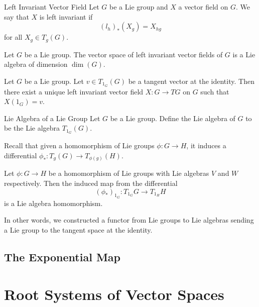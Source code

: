 \documentclass[a4paper]{article}
\begin{document}
\begin{defn}{Left Invariant Vector Field}{} Let $G$ be a Lie group and $X$ a vector field on $G$. We say that $X$ is left invariant if $$(l_h)_\ast(X_g)=X_{hg}$$ for all $X_g\in T_g(G)$. 
\end{defn}

\begin{prp}{}{} Let $G$ be a Lie group. The vector space of left invariant vector fields of $G$ is a Lie algebra of dimension $\dim(G)$. 
\end{prp}

\begin{prp}{}{} Let $G$ be a Lie group. Let $v\in T_{1_G}(G)$ be a tangent vector at the identity. Then there exist a unique left invariant vector field $X:G\to TG$ on $G$ such that $X({1_G})=v$. 
\end{prp}

\begin{defn}{Lie Algebra of a Lie Group}{} Let $G$ be a Lie group. Define the Lie algebra of $G$ to be the Lie algebra $T_{1_G}(G)$. 
\end{defn}

Recall that given a homomorphism of Lie groups $\phi:G\to H$, it induces a differential $\phi_\ast:T_g(G)\to T_{\phi(g)}(H)$. 

\begin{prp}{}{} Let $\phi:G\to H$ be a homomorphism of Lie groups with Lie algebras $V$ and $W$ respectively. Then the induced map from the differential $$(\phi_\ast)_{1_G}:T_{1_G}G\to T_{1_H}H$$ is a Lie algebra homomorphism. 
\end{prp}

In other words, we constructed a functor from Lie groups to Lie algebras sending a Lie group to the tangent space at the identity. 

\subsection{The Exponential Map}

\pagebreak
\section{Root Systems of Vector Spaces}
\end{document}
